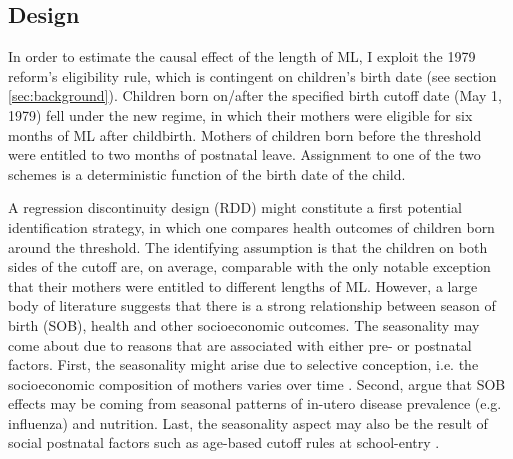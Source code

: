 \documentclass[11pt, a4paper, draft]{article} %
\begin{document}
\subsection{Design}\label{sec:empirical_strategy_1design}
In order to estimate the causal effect of the length of ML, I exploit the 1979 reform's eligibility rule, which is contingent on children's birth date (see section \ref{sec:background}). Children born on/after the specified birth cutoff date (May 1, 1979) fell under the new regime, in which their mothers were eligible for six months of ML after childbirth. Mothers of children born before the threshold were entitled to two months of postnatal leave. Assignment to one of the two schemes is a deterministic function of the birth date of the child.


A regression discontinuity design (RDD) might constitute a first potential identification strategy, in which one compares health outcomes of children born around the threshold. The identifying assumption is that the children on both sides of the cutoff are, on average, comparable with the only notable exception that their mothers were entitled to different lengths of ML. However, a large body of literature suggests that there is a strong relationship between season of birth (SOB), health and other socioeconomic outcomes. The seasonality may come about due to reasons that are associated with either pre- or postnatal factors. First, the seasonality might arise due to selective conception, i.e. the socioeconomic composition of mothers varies over time \citep{buckles2013season}. Second, \cite{currie2013within} argue that SOB effects may be coming from seasonal patterns of in-utero disease prevalence (e.g. influenza) and nutrition. Last, the seasonality aspect may also be the result of social postnatal factors such as age-based cutoff rules at school-entry \citep{black2011too}.
\end{document}
